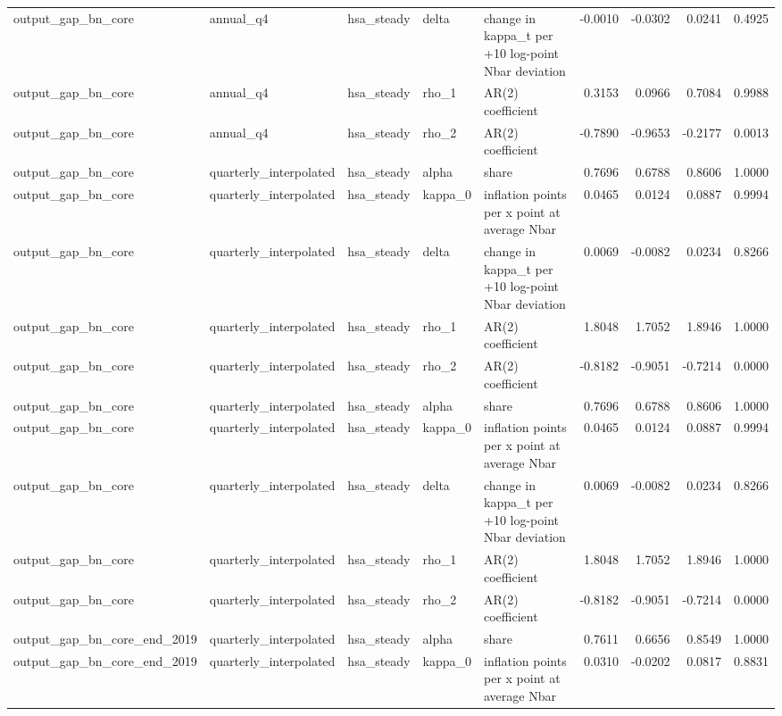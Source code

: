 \begin{tabular}{lllllrrrr}
output\_gap\_bn\_core & annual\_q4 & hsa\_steady & delta & change in kappa\_t per +10 log-point Nbar deviation & -0.0010 & -0.0302 & 0.0241 & 0.4925 \\
output\_gap\_bn\_core & annual\_q4 & hsa\_steady & rho\_1 & AR(2) coefficient & 0.3153 & 0.0966 & 0.7084 & 0.9988 \\
output\_gap\_bn\_core & annual\_q4 & hsa\_steady & rho\_2 & AR(2) coefficient & -0.7890 & -0.9653 & -0.2177 & 0.0013 \\
output\_gap\_bn\_core & quarterly\_interpolated & hsa\_steady & alpha & share & 0.7696 & 0.6788 & 0.8606 & 1.0000 \\
output\_gap\_bn\_core & quarterly\_interpolated & hsa\_steady & kappa\_0 & inflation points per x point at average Nbar & 0.0465 & 0.0124 & 0.0887 & 0.9994 \\
output\_gap\_bn\_core & quarterly\_interpolated & hsa\_steady & delta & change in kappa\_t per +10 log-point Nbar deviation & 0.0069 & -0.0082 & 0.0234 & 0.8266 \\
output\_gap\_bn\_core & quarterly\_interpolated & hsa\_steady & rho\_1 & AR(2) coefficient & 1.8048 & 1.7052 & 1.8946 & 1.0000 \\
output\_gap\_bn\_core & quarterly\_interpolated & hsa\_steady & rho\_2 & AR(2) coefficient & -0.8182 & -0.9051 & -0.7214 & 0.0000 \\
output\_gap\_bn\_core & quarterly\_interpolated & hsa\_steady & alpha & share & 0.7696 & 0.6788 & 0.8606 & 1.0000 \\
output\_gap\_bn\_core & quarterly\_interpolated & hsa\_steady & kappa\_0 & inflation points per x point at average Nbar & 0.0465 & 0.0124 & 0.0887 & 0.9994 \\
output\_gap\_bn\_core & quarterly\_interpolated & hsa\_steady & delta & change in kappa\_t per +10 log-point Nbar deviation & 0.0069 & -0.0082 & 0.0234 & 0.8266 \\
output\_gap\_bn\_core & quarterly\_interpolated & hsa\_steady & rho\_1 & AR(2) coefficient & 1.8048 & 1.7052 & 1.8946 & 1.0000 \\
output\_gap\_bn\_core & quarterly\_interpolated & hsa\_steady & rho\_2 & AR(2) coefficient & -0.8182 & -0.9051 & -0.7214 & 0.0000 \\
output\_gap\_bn\_core\_end\_2019 & quarterly\_interpolated & hsa\_steady & alpha & share & 0.7611 & 0.6656 & 0.8549 & 1.0000 \\
output\_gap\_bn\_core\_end\_2019 & quarterly\_interpolated & hsa\_steady & kappa\_0 & inflation points per x point at average Nbar & 0.0310 & -0.0202 & 0.0817 & 0.8831 \\

\end{tabular}
